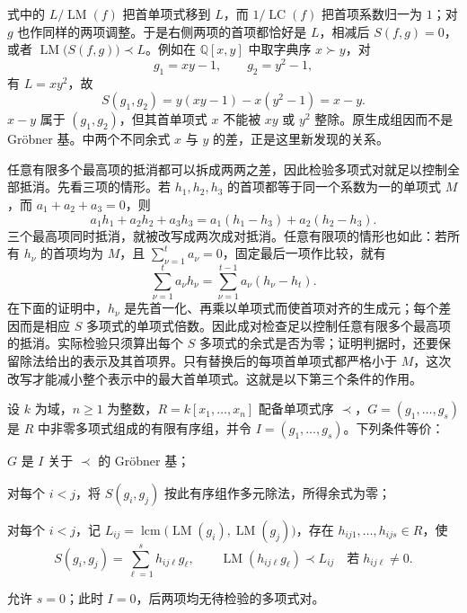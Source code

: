 式中的 \(L/\operatorname{LM}(f)\) 把首单项式移到 \(L\)，而 \(1/\operatorname{LC}(f)\) 把首项系数归一为 \(1\)；对 \(g\) 也作同样的两项调整。于是右侧两项的首项都恰好是 \(L\)，相减后 \(S(f,g)=0\)，或者 \(\operatorname{LM}\bigl(S(f,g)\bigr)\prec L\)。例如在 \(\mathbb Q[x,y]\) 中取字典序 \(x\succ y\)，对
\[
	g_1=xy-1,\qquad g_2=y^2-1,
\]
有 \(L=xy^2\)，故
\begin{equation}\label{b1:eq:F-first-s-polynomial}
	S(g_1,g_2)=y(xy-1)-x(y^2-1)=x-y.
\end{equation}
\(x-y\) 属于 \((g_1,g_2)\)，但其首单项式 \(x\) 不能被 \(xy\) 或 \(y^2\) 整除。原生成组因而不是 Gröbner 基。中两个不同余式 \(x\) 与 \(y\) 的差，正是这里新发现的关系。

\ProseParagraphBreak
任意有限多个最高项的抵消都可以拆成两两之差，因此检验多项式对就足以控制全部抵消。先看三项的情形。若 \(h_1,h_2,h_3\) 的首项都等于同一个系数为一的单项式 \(M\)，而 \(a_1+a_2+a_3=0\)，则
\[
	a_1h_1+a_2h_2+a_3h_3 =a_1(h_1-h_3)+a_2(h_2-h_3).
\]
三个最高项同时抵消，就被改写成两次成对抵消。任意有限项的情形也如此：若所有 \(h_\nu\) 的首项均为 \(M\)，且 \(\sum_{\nu=1}^t a_\nu=0\)，固定最后一项作比较，就有
\[
	\sum_{\nu=1}^t a_\nu h_\nu =\sum_{\nu=1}^{t-1}a_\nu(h_\nu-h_t).
\]
在下面的证明中，\(h_\nu\) 是先首一化、再乘以单项式而使首项对齐的生成元；每个差因而是相应 \(S\) 多项式的单项式倍数。因此成对检查足以控制任意有限多个最高项的抵消。实际检验只须算出每个 \(S\) 多项式的余式是否为零；证明判据时，还要保留除法给出的表示及其首项界。只有替换后的每项首单项式都严格小于 \(M\)，这次改写才能减小整个表示中的最大首单项式。这就是以下第三个条件的作用。

\begin{theorem}[Buchberger 判据]\label{b1:thm:F-buchberger-criterion}
	设 \(k\) 为域，\(n\geq1\) 为整数，\(R=k[x_1,\ldots,x_n]\) 配备单项式序 \(\prec\)，\(G=(g_1,\ldots,g_s)\) 是 \(R\) 中非零多项式组成的有限有序组，并令 \(I=(g_1,\ldots,g_s)\)。下列条件等价：
	\begin{equivalences}
		\item\label{b1:item:F-buchberger-gb} \(G\) 是 \(I\) 关于 \(\prec\) 的 Gröbner 基；
		\item\label{b1:item:F-buchberger-remainder} 对每个 \(i<j\)，将 \(S(g_i,g_j)\) 按此有序组作多元除法，所得余式为零；
		\item\label{b1:item:F-buchberger-bound} 对每个 \(i<j\)，记 \(L_{ij}=\operatorname{lcm}\bigl(\operatorname{LM}(g_i),\operatorname{LM}(g_j)\bigr)\)，存在 \(h_{ij1},\ldots,h_{ijs}\in R\)，使
			\begin{equation}\label{b1:eq:F-s-bounded-representation}
				S(g_i,g_j)=\sum_{\ell=1}^s h_{ij\ell}g_\ell, \qquad \operatorname{LM}(h_{ij\ell}g_\ell)\prec L_{ij} \quad\text{若}\;h_{ij\ell}\ne0.
			\end{equation}
	\end{equivalences}
	允许 \(s=0\)；此时 \(I=0\)，后两项均无待检验的多项式对。
\end{theorem}

